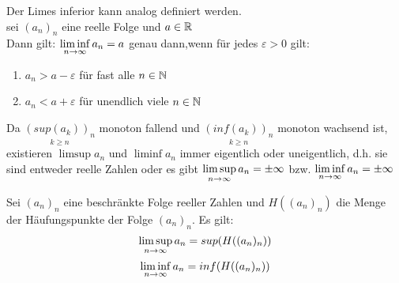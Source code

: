 \documentclass[../ana1u.tex]{subfiles}
\begin{document}
\begin{bem}
    Der Limes inferior kann analog definiert werden. \\
    sei \((a_n)_n \) eine reelle Folge und \(a \in \mathbb{R} \) \\
    Dann gilt: \(\liminf\limits_{n\rightarrow\infty} a_n = a \) genau dann,wenn für jedes \(\varepsilon > 0 \) gilt:
    \begin{enumerate}
        \item \(a_n > a - \varepsilon \) für fast alle \(n \in \mathbb{N} \)
        \item \(a_n < a + \varepsilon \) für unendlich viele \(n \in \mathbb{N} \)
    \end{enumerate}
\end{bem}
\begin{bem}
    Da \(\underset{k \geq n}{(sup(a_k))_n}\) monoton fallend und \(\underset{k \geq n}{(inf(a_k))_n}\) monoton wachsend ist, existieren \(\limsup a_n \) und \(\liminf a_n\) immer eigentlich oder uneigentlich, d.h. sie sind entweder reelle Zahlen oder es gibt \(\limsup\limits_{n\rightarrow\infty} a_n = \pm \infty \) bzw. \(\liminf\limits_{n\rightarrow\infty} a_n = \pm \infty \) 
\end{bem}
\begin{lem}
    Sei \((a_n)_n \) eine beschränkte Folge reeller Zahlen und \(H((a_n)_n) \) 
    die Menge der Häufungspunkte der Folge \((a_n)_n \). Es gilt:
    \[\limsup\limits_{n\rightarrow\infty} a_n = sup(H((a_n)_n))\]
    \[\liminf\limits_{n\rightarrow\infty} a_n = inf(H((a_n)_n))\]
\end{lem}
\end{document}
